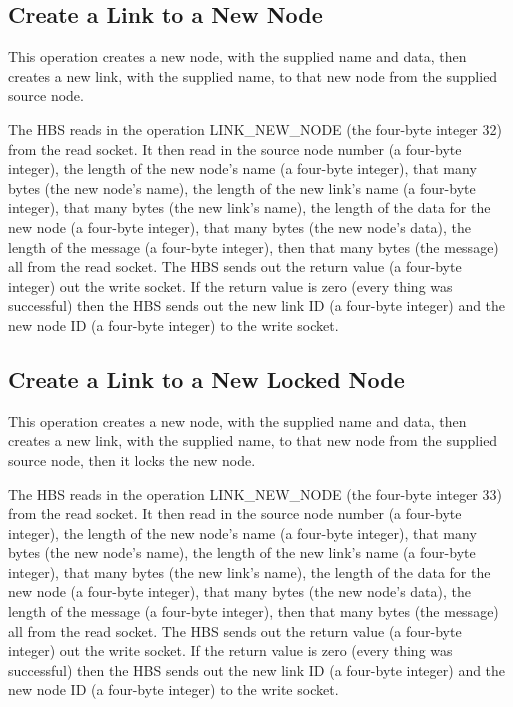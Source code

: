 \subsection{Create a Link to a New Node}

This operation creates a new node, with the supplied name and data, then
creates a new link, with the supplied name, to that new node from the
supplied source node.

The HBS reads in the operation LINK\_NEW\_NODE (the four-byte integer 32)
from the read socket.  It then read in the source node number (a four-byte
integer), the length of the new node's name (a four-byte integer), that
many bytes (the new node's name), the length of the new link's name (a
four-byte integer), that many bytes (the new link's name), the length of
the data for the new node (a four-byte integer), that many bytes (the new
node's data), the length of the message (a four-byte integer), then that
many bytes (the message) all from the read socket. The HBS sends out the
return value (a four-byte integer) out the write socket.  If the return
value is zero (every thing was successful) then the HBS sends out the new
link ID (a four-byte integer) and the new node ID (a four-byte integer) to
the write socket.


\subsection{Create a Link to a New Locked Node}

This operation creates a new node, with the supplied name and data, then
creates a new link, with the supplied name, to that new node from the
supplied source node, then it locks the new node.

The HBS reads in the operation LINK\_NEW\_NODE (the four-byte integer 33)
from the read socket.  It then read in the source node number (a four-byte
integer), the length of the new node's name (a four-byte integer), that
many bytes (the new node's name), the length of the new link's name (a
four-byte integer), that many bytes (the new link's name), the length of
the data for the new node (a four-byte integer), that many bytes (the new
node's data), the length of the message (a four-byte integer), then that
many bytes (the message) all from the read socket. The HBS sends out the
return value (a four-byte integer) out the write socket.  If the return
value is zero (every thing was successful) then the HBS sends out the new
link ID (a four-byte integer) and the new node ID (a four-byte integer) to
the write socket.

